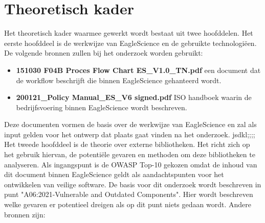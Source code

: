 \section{Theoretisch kader}\label{sec:theoretisch-kader}
Het theoretisch kader waarmee gewerkt wordt bestaat uit twee hoofddelen. Het eerste hoofddeel is de werkwijze van EagleScience en de gebruikte technologiëen. De volgende bronnen zullen bij het onderzoek worden gebruikt:
\begin{itemize}
    \item \textbf{151030 F04B Proces Flow Chart ES\_V1.0\_TN.pdf} een document dat de workflow beschrijft die binnen EagleScience gehanteerd wordt.
    \item \textbf{200121\_Policy Manual\_ES\_V6 signed.pdf} ISO handboek waarin de bedrijfsvoering binnen EagleScience wordt beschreven.
\end{itemize}
Deze documenten vormen de basis over de werkwijze van EagleScience en zal als input gelden voor het ontwerp dat plaats gaat vinden na het onderzoek.
jsdkl;;;;
Het tweede hoofddeel is de theorie over externe bibliotheken. Het richt zich op het gebruik hiervan, de potentiële gevaren en methoden om deze bibliotheken te analyseren. Als ingangspunt is de OWASP Top-10 gekozen omdat de inhoud van dit document binnen EagleScience geldt als aandachtspunten voor het ontwikkelen van veilige software. De basis voor dit onderzoek wordt beschreven in punt "A06:2021-Vulnerable and Outdated Components". Hier wordt beschreven welke gevaren er potentieel dreigen als op dit punt niets gedaan wordt. Andere bronnen zijn:
